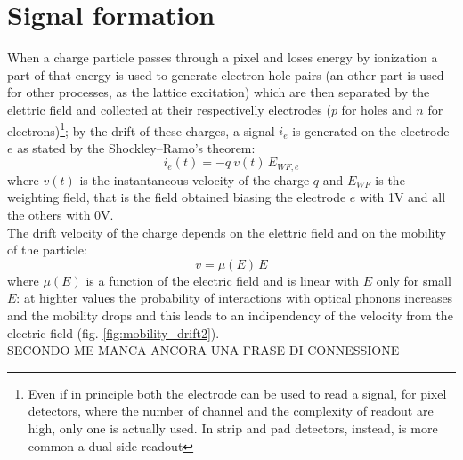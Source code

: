 \label{Appendix:pixels_overview}
\section{Signal formation}
    When a charge particle passes through a pixel and loses energy by ionization a part of that energy is used to generate electron-hole pairs (an other part is used for other processes, as the lattice excitation) which are then separated by the elettric field and collected at their respectivelly electrodes ($p$ for holes and $n$ for electrons)\footnote{Even if in principle both the electrode can be used to read a signal, for pixel detectors, where the number of channel and the complexity of readout are high, only one is actually used. In strip and pad detectors, instead, is more common a dual-side readout}; by the drift of these charges, a signal $i_e$ is generated on the  electrode $e$ as stated by the Shockley–Ramo's theorem: 
    \begin{equation}
        i_e(t) = -q\: v(t)\, E_{WF,e}
    \end{equation}
    where $v(t)$ is the instantaneous velocity of the charge $q$ and $E_{WF}$ is the weighting field, that is the field obtained biasing the electrode $e$ with 1V and all the others with 0V.\\
    The drift velocity of the charge depends on the elettric field and on the mobility of the particle:
    \begin{equation}
        v = \mu(E)\, E
    \end{equation}
    where $\mu(E)$ is a function of the electric field and is linear with $E$ only for small $E$: at highter values the probability of interactions with optical phonons increases and the mobility drops and this leads to an indipendency of the velocity from the electric field (fig. \ref{fig:mobility_drift2}).\\
    SECONDO ME MANCA ANCORA UNA FRASE DI CONNESSIONE\\
